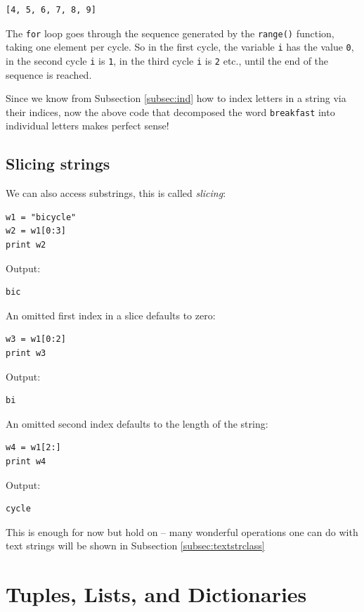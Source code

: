 \begin{verbatim}
[4, 5, 6, 7, 8, 9]
\end{verbatim}
The {\tt for} loop goes through the sequence generated by the {\tt range()} function, 
taking one element per cycle. So in the first cycle, the variable {\tt i}
has the value {\tt 0}, in the second cycle {\tt i} is {\tt 1}, in the third cycle 
{\tt i} is {\tt 2} etc., until the end of the sequence is reached. 

Since we know from Subsection \ref{subsec:ind} 
how to index letters in a string via their indices, now the above 
code that decomposed the word {\tt breakfast} into individual letters
makes perfect sense!

\subsection{Slicing strings}

We can also access substrings, this is called {\em slicing}:

\begin{verbatim}
w1 = "bicycle"
w2 = w1[0:3]
print w2
\end{verbatim}
Output:

\begin{verbatim}
bic
\end{verbatim}
An omitted first index in a slice defaults to zero:

\begin{verbatim}
w3 = w1[0:2]
print w3
\end{verbatim}
Output:

\begin{verbatim}
bi
\end{verbatim}
An omitted second index defaults to the length of the string:

\begin{verbatim}
w4 = w1[2:]
print w4
\end{verbatim}
Output:

\begin{verbatim}
cycle
\end{verbatim}
This is enough for now but hold on -- many wonderful operations one 
can do with text strings will be shown in Subsection \ref{subsec:textstrclass}



\section{Tuples, Lists, and Dictionaries}\label{sec:lists}

